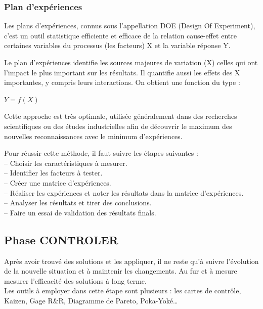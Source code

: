 \documentclass[12pt, a4paper]{thesis}
\begin{document}
\subsubsection{Plan d'expériences}
Les plans d'expériences, connus sous l'appellation DOE (Design Of Experiment), c'est un outil statistique efficiente et efficace de la relation cause-effet entre certaines variables du processus (les facteurs) X et la variable réponse Y.

Le plan d'expériences identifie les sources majeures de variation (X) celles qui ont l'impact le plus important sur les résultats. Il quantifie aussi les effets des X importantes, y compris leurs interactions. On obtient une fonction du type :
\begin{center}
$Y=f(X)$
\end{center} 
Cette approche est très optimale, utilisée généralement dans des recherches scientifiques ou des études industrielles afin de découvrir le maximum des nouvelles reconnaissances avec le minimum d'expériences.

Pour réussir cette méthode, il faut suivre les étapes suivantes :\\
– Choisir les caractéristiques à mesurer. \\
– Identifier les facteurs à tester. \\
– Créer une matrice d’expériences.\\
– Réaliser les expériences et noter les résultats dans la matrice d’expériences.\\
– Analyser les résultats et tirer des conclusions. \\
– Faire un essai de validation des résultats finals.\\


\subsection{Phase CONTROLER}


Après avoir trouvé des solutions et les appliquer, il ne reste qu’à suivre l’évolution de la nouvelle situation et à maintenir les changements. Au fur et à mesure mesurer l’efficacité des solutions à long terme.\\
Les outils à employer dans cette étape sont plusieurs : les cartes de contrôle, Kaizen, Gage R\&R, Diagramme de Pareto, Poka-Yoké…
\end{document}

